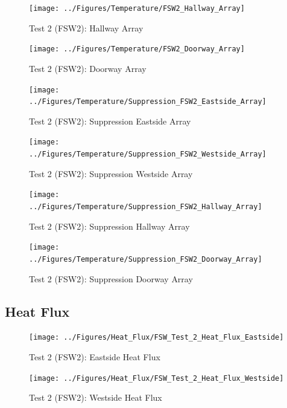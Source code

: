 \documentclass[12pt,oneside]{book}
\begin{document}
\begin{figure}[!ht]
	\texttt{[image: ../Figures/Temperature/FSW2\_Hallway\_Array]}
	\caption{Test 2 (FSW2): Hallway Array}
	\label{fig:Test_2_Hallway_Array}
\end{figure}

\begin{figure}[!ht]
	\texttt{[image: ../Figures/Temperature/FSW2\_Doorway\_Array]}
	\caption{Test 2 (FSW2): Doorway Array}
	\label{fig:Test_2_Doorway_Array}
\end{figure}

\begin{figure}[!ht]
	\texttt{[image: ../Figures/Temperature/Suppression\_FSW2\_Eastside\_Array]}
	\caption{Test 2 (FSW2): Suppression Eastside Array}
	\label{fig:Test_2_Suppression_Eastside_Array}
\end{figure}

\begin{figure}[!ht]
	\texttt{[image: ../Figures/Temperature/Suppression\_FSW2\_Westside\_Array]}
	\caption{Test 2 (FSW2): Suppression Westside Array}
	\label{fig:Test_2_Suppression_Westside_Array}
\end{figure}

\begin{figure}[!ht]
	\texttt{[image: ../Figures/Temperature/Suppression\_FSW2\_Hallway\_Array]}
	\caption{Test 2 (FSW2): Suppression Hallway Array}
	\label{fig:Test_2_Suppression_Hallway_Array}
\end{figure}

\begin{figure}[!ht]
	\texttt{[image: ../Figures/Temperature/Suppression\_FSW2\_Doorway\_Array]}
	\caption{Test 2 (FSW2): Suppression Doorway Array}
	\label{fig:Test_2_Suppression_Doorway_Array}
\end{figure}

\subsection{Heat Flux}
\label{subsec:Heat_Flux}

\begin{figure}[!ht]
	\texttt{[image: ../Figures/Heat\_Flux/FSW\_Test\_2\_Heat\_Flux\_Eastside]}
	\caption{Test 2 (FSW2): Eastside Heat Flux}
	\label{fig:Test_2_Eastside_Heat_Flux}
\end{figure}

\begin{figure}[!ht]
	\texttt{[image: ../Figures/Heat\_Flux/FSW\_Test\_2\_Heat\_Flux\_Westside]}
	\caption{Test 2 (FSW2): Westside Heat Flux}
	\label{fig:Test_2_Westside_Heat_Flux}
\end{figure}
\end{document}
